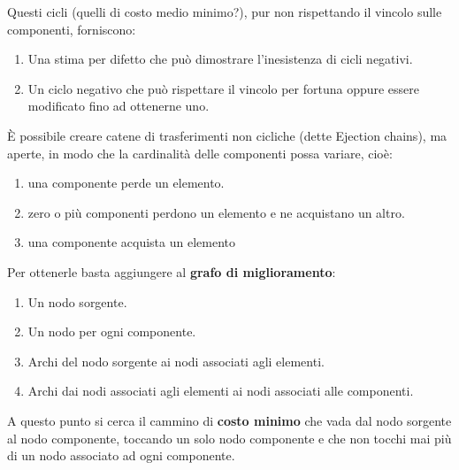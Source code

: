 \documentclass[\main/main.tex]{subfiles}
\begin{document}
\begin{multicols}{2}
\begin{observation}
    Questi cicli (quelli di costo medio minimo?), pur non rispettando il vincolo sulle componenti, forniscono:
    \begin{enumerate}
        \item Una stima per difetto che può dimostrare l'inesistenza di cicli negativi.
        \item Un ciclo negativo che può rispettare il vincolo per fortuna oppure essere modificato fino ad ottenerne uno.
    \end{enumerate}
\end{observation}
\begin{definition}
    È possibile creare catene di trasferimenti non cicliche (dette Ejection chains), ma aperte, in modo che la cardinalità delle componenti possa variare, cioè:
    \begin{enumerate}
        \item una componente perde un elemento.
        \item zero o più componenti perdono un elemento e ne acquistano un altro.
        \item una componente acquista un elemento
    \end{enumerate}
    Per ottenerle basta aggiungere al \textbf{grafo di miglioramento}:
    \begin{enumerate}
        \item Un nodo sorgente.
        \item Un nodo per ogni componente.
        \item Archi del nodo sorgente ai nodi associati agli elementi.
        \item Archi dai nodi associati agli elementi ai nodi associati alle componenti.
    \end{enumerate}
    
    A questo punto si cerca il cammino di \textbf{costo minimo} che vada dal nodo sorgente al nodo componente, toccando un solo nodo componente e che non tocchi mai più di un nodo associato ad ogni componente.
\end{definition}
\end{multicols}
\clearpage
\end{document}
